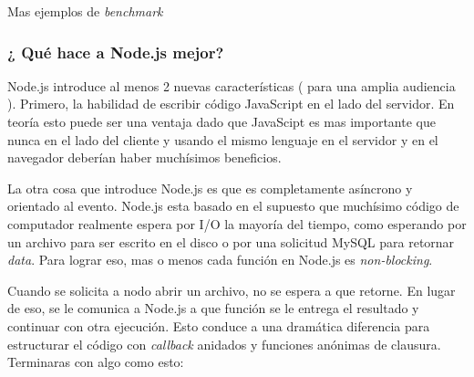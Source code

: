 Mas ejemplos de \textit{benchmark} \cite{online_nodejs_java_appdynamics}


\subsubsection{¿ Qué hace a Node.js mejor?}

Node.js introduce al menos 2 nuevas características ( para una amplia audiencia ). Primero, la habilidad  de escribir código JavaScript en el lado del servidor. En teoría esto puede ser una ventaja dado que JavaScipt es mas importante que nunca en el lado del cliente y usando el mismo lenguaje en el servidor y en el navegador deberían haber muchísimos beneficios. 

La otra cosa que introduce Node.js es que es completamente asíncrono y orientado al evento. Node.js esta basado en el supuesto que muchísimo código de computador realmente espera por I/O la mayoría del tiempo, como esperando por un archivo para ser escrito en el disco o por una solicitud MySQL para retornar \textit{data}. Para lograr eso, mas o menos cada función en Node.js es \textit{non-blocking}.

Cuando se solicita a nodo abrir un archivo, no se espera a que retorne. En lugar de eso, se le comunica a Node.js a que función se le entrega el resultado y continuar con otra ejecución. Esto conduce a una dramática diferencia  para estructurar el código con \textit{callback} anidados y funciones anónimas de clausura.  Terminaras con algo como esto:


